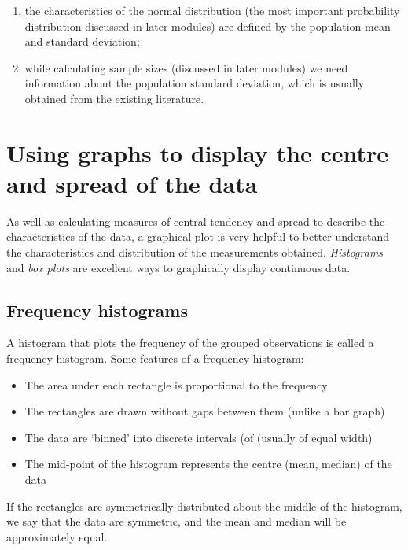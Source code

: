 \documentclass[
]{memoir}
\providecommand{\tightlist}{%
  \setlength{\itemsep}{0pt}\setlength{\parskip}{0pt}}
\begin{document}
\begin{enumerate}
\def\labelenumi{\arabic{enumi}.}
\tightlist
\item
  the characteristics of the normal distribution (the most important probability distribution discussed in later modules) are defined by the population mean and standard deviation;
\item
  while calculating sample sizes (discussed in later modules) we need information about the population standard deviation, which is usually obtained from the existing literature.
\end{enumerate}

\hypertarget{using-graphs-to-display-the-centre-and-spread-of-the-data}{%
\section{Using graphs to display the centre and spread of the data}\label{using-graphs-to-display-the-centre-and-spread-of-the-data}}

As well as calculating measures of central tendency and spread to describe the characteristics of the data, a graphical plot is very helpful to better understand the characteristics and distribution of the measurements obtained. \emph{Histograms} and \emph{box plots} are excellent ways to graphically display continuous data.

\hypertarget{frequency-histograms}{%
\subsection{Frequency histograms}\label{frequency-histograms}}

A histogram that plots the frequency of the grouped observations is called a frequency histogram. Some features of a frequency histogram:

\begin{itemize}
\tightlist
\item
  The area under each rectangle is proportional to the frequency
\item
  The rectangles are drawn without gaps between them (unlike a bar graph)
\item
  The data are `binned' into discrete intervals (of (usually of equal width)
\item
  The mid-point of the histogram represents the centre (mean, median) of the data
\end{itemize}

If the rectangles are symmetrically distributed about the middle of the histogram, we say that the data are symmetric, and the mean and median will be approximately equal.
\end{document}
